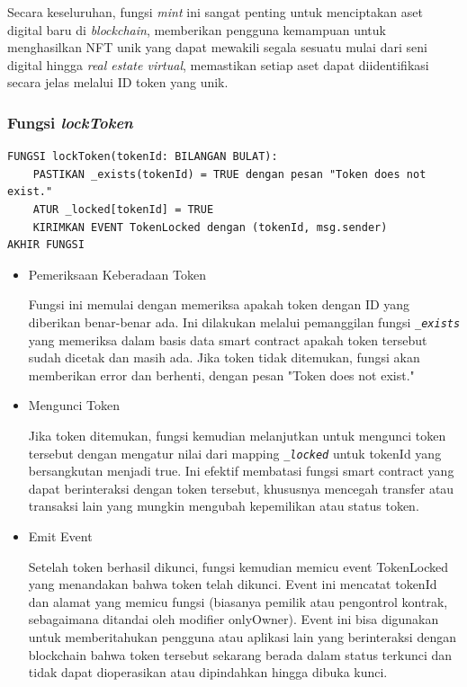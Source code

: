 Secara keseluruhan, fungsi \emph{mint} ini sangat penting untuk menciptakan aset digital baru di \emph{blockchain}, memberikan pengguna kemampuan untuk menghasilkan NFT unik yang dapat mewakili segala sesuatu mulai dari seni digital hingga \emph{real estate virtual}, memastikan setiap aset dapat diidentifikasi secara jelas melalui ID token yang unik.
    
\subsubsection{Fungsi \emph{lockToken}}
\begin{lstlisting}[caption=Fungsi lockToken]
FUNGSI lockToken(tokenId: BILANGAN BULAT):
    PASTIKAN _exists(tokenId) = TRUE dengan pesan "Token does not exist."
    ATUR _locked[tokenId] = TRUE
    KIRIMKAN EVENT TokenLocked dengan (tokenId, msg.sender)
AKHIR FUNGSI
\end{lstlisting}

\begin{itemize}
    \item Pemeriksaan Keberadaan Token
    
    Fungsi ini memulai dengan memeriksa apakah token dengan ID yang diberikan benar-benar ada. Ini dilakukan melalui pemanggilan fungsi \emph{\texttt{\_exists}} yang memeriksa dalam basis data smart contract apakah token tersebut sudah dicetak dan masih ada. Jika token tidak ditemukan, fungsi akan memberikan error dan berhenti, dengan pesan "Token does not exist."

    \item Mengunci Token
    
    Jika token ditemukan, fungsi kemudian melanjutkan untuk mengunci token tersebut dengan mengatur nilai dari mapping \emph{\texttt{\_locked}} untuk tokenId yang bersangkutan menjadi true. Ini efektif membatasi fungsi smart contract yang dapat berinteraksi dengan token tersebut, khususnya mencegah transfer atau transaksi lain yang mungkin mengubah kepemilikan atau status token.

    \item Emit Event
    
    Setelah token berhasil dikunci, fungsi kemudian memicu event TokenLocked yang menandakan bahwa token telah dikunci. Event ini mencatat tokenId dan alamat yang memicu fungsi (biasanya pemilik atau pengontrol kontrak, sebagaimana ditandai oleh modifier onlyOwner). Event ini bisa digunakan untuk memberitahukan pengguna atau aplikasi lain yang berinteraksi dengan blockchain bahwa token tersebut sekarang berada dalam status terkunci dan tidak dapat dioperasikan atau dipindahkan hingga dibuka kunci.
\end{itemize}

